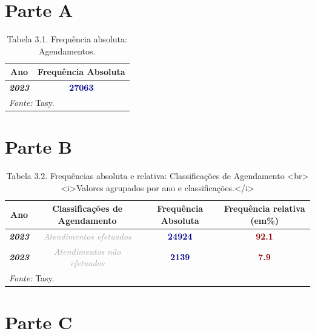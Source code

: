 \documentclass[
  letterpaper,
  DIV=11,
  numbers=noendperiod]{scrreprt}
\begin{document}

\section{Parte A}

\begin{table}
\centering
\caption{Tabela 3.1. Frequência absoluta: Agendamentos.}
\centering
\begin{tabular}[t]{>{}c|>{}c}
\hline
Ano & Frequência Absoluta\\
\hline
\textcolor{black}{\em{\textbf{2023}}} & \textcolor{darkblue}{\textbf{27063}}\\
\hline
\multicolumn{2}{l}{\rule{0pt}{1em}\textit{Fonte: } Tasy.}\\
\end{tabular}
\end{table}

\section{Parte B}

\begin{table}
\centering
\caption{Tabela 3.2. Frequências absoluta e relativa: Classificações de Agendamento  <br><i>Valores agrupados por ano e classificações.</i>}
\centering
\begin{tabular}[t]{>{}c|>{}c|>{}c|>{}c}
\hline
Ano & Classificações de Agendamento & Frequência Absoluta & Frequência relativa (em\%)\\
\hline
\textcolor{black}{\em{\textbf{2023}}} & \textcolor{darkgray}{\em{Atendimentos efetuados}} & \textcolor{darkblue}{\textbf{24924}} & \textcolor{darkred}{\textbf{92.1}}\\
\hline
\textcolor{black}{\em{\textbf{2023}}} & \textcolor{darkgray}{\em{Atendimentos não efetuados}} & \textcolor{darkblue}{\textbf{2139}} & \textcolor{darkred}{\textbf{7.9}}\\
\hline
\multicolumn{4}{l}{\rule{0pt}{1em}\textit{Fonte: } Tasy.}\\
\end{tabular}
\end{table}

\section{Parte C}
\end{document}
